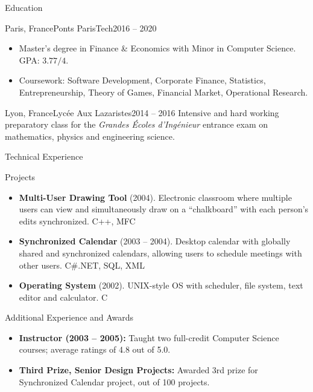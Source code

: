 \documentclass[]{mcdowellcv}
\begin{document}
    \begin{cvsection}{Education}
        \begin{cvsubsection}{Paris, France}{Ponts ParisTech}{2016 -- 2020}
            \begin{itemize}
                \item Master's degree in Finance \& Economics with Minor in Computer Science. GPA: \(3.77 / 4\).
                \item Coursework: Software Development, Corporate Finance, Statistics, Entrepreneurship, Theory of Games, Financial Market, Operational Research.
            \end{itemize}
        \end{cvsubsection}

        \begin{cvsubsection}{Lyon, France}{Lyc\'ee Aux Lazaristes}{2014 -- 2016}
            Intensive and hard working preparatory class for the \textit{Grandes \'Ecoles d'Ing\'enieur} entrance exam on mathematics, physics and engineering science.
        \end{cvsubsection}
    \end{cvsection}

    \begin{cvsection}{Technical Experience}
        \begin{cvsubsection}{Projects}{}{}
            \begin{itemize}
                \item \textbf{Multi-User Drawing Tool} (2004). Electronic classroom where multiple users can view and simultaneously draw on a “chalkboard” with each person’s edits synchronized. C++, MFC
                \item \textbf{Synchronized Calendar} (2003 – 2004). Desktop calendar with globally shared and synchronized calendars, allowing users to schedule meetings with other users. C\#.NET, SQL, XML
                \item \textbf{Operating System} (2002). UNIX-style OS with scheduler, file system, text editor and calculator. C
            \end{itemize}
        \end{cvsubsection}
    \end{cvsection}

    \begin{cvsection}{Additional Experience and Awards}
        \begin{cvsubsection}{}{}{}
            \begin{itemize}
                \item \textbf{Instructor (2003 – 2005):} Taught two full-credit Computer Science courses; average ratings of 4.8 out of 5.0.
                \item \textbf{Third Prize, Senior Design Projects:} Awarded 3rd prize for Synchronized Calendar project, out of 100 projects.
            \end{itemize}
        \end{cvsubsection}
    \end{cvsection}
\end{document}
